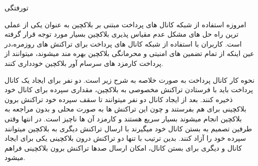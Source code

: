 


\pagestyle{empty}

‌تورفتگی

امروزه استفاده از شبکه کانال های پرداخت مبتنی بر بلاکچین به عنوان یکی از عملی ترین راه حل های مشکل عدم مقیاس پذیری بلاکچین بسیار مورد توجه قرار گرفته است.  کاربران با استفاده از شبکه کانال های پرداخت برای تراکنش های روزمره،در عین اینکه از تمام تضمین های امنیتی و محرمانگی بلاکچین بهره مند میشوند، میتوانند از پرداخت کارمزد های سرسام آور بلاکچین خودداری کنند.  


نحوه کار کانال پرداخت به صورت خلاصه به شرح زیر است. دو نفر برای ایجاد یک کانال پرداخت باید با فرستادن تراکنش مخصوصی به بلاکچین، مقداری سپرده برای کانال خود ذخیره کنند. بعد از ایجاد کانال دو نفر میتوانند تا سقف سپرده خود تراکنش برون بلاکچینی  برای هم بفرستند و چون این تراکنش ها به صورت محلی و بدون مراجعه به بلاکچین انجام میشوند بسیار سریع هستند و کارمزد آن ها ناچیز است. در انتها وقتی طرفین تصمیم به بستن کانال خود میگیرند با ارسال تراکنش دیگری به بلاکچین میتوانند سپرده خود را آزاد کنند. بدین ترتیب با تنها دو تراکنش درون بلاکچینی یکی برای ایجاد کانال و دیگری برای بستن کانال، امکان ارسال صدها تراکنش برون بلاکچینی فراهم میشود.

